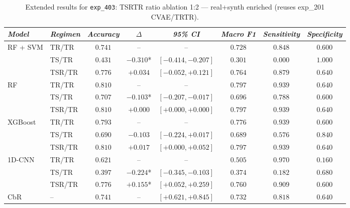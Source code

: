 \begin{table}[H]
\centering
\scriptsize
\caption{Extended results for \texttt{exp\_403}: TSRTR ratio ablation 1:2 — real+synth enriched (reuses exp\_201 CVAE/TRTR).}
\label{tab:appendix_exp_403}
\begin{tabular*}{\textwidth}{@{\extracolsep{\fill}}llcccccc}
\toprule
\emph{Model} & \emph{Regimen} & \emph{Accuracy} & \emph{$\Delta$} & \emph{95\% CI} & \emph{Macro F1} & \emph{Sensitivity} & \emph{Specificity}\\
\midrule
\multirow{3}{*}{RF + SVM} & TR/TR & $0.741$ & -- & -- & $0.728$ & $0.848$ & $0.600$\\
 & TS/TR & $0.431$ & $-0.310$* & $[-0.414, -0.207]$ & $0.301$ & $0.000$ & $1.000$\\
 & TSR/TR & $0.776$ & $+0.034$ & $[-0.052, +0.121]$ & $0.764$ & $0.879$ & $0.640$\\
\midrule
\multirow{3}{*}{RF} & TR/TR & $0.810$ & -- & -- & $0.797$ & $0.939$ & $0.640$\\
 & TS/TR & $0.707$ & $-0.103$* & $[-0.207, -0.017]$ & $0.696$ & $0.788$ & $0.600$\\
 & TSR/TR & $0.810$ & $+0.000$ & $[+0.000, +0.000]$ & $0.797$ & $0.939$ & $0.640$\\
\midrule
\multirow{3}{*}{XGBoost} & TR/TR & $0.793$ & -- & -- & $0.776$ & $0.939$ & $0.600$\\
 & TS/TR & $0.690$ & $-0.103$ & $[-0.224, +0.017]$ & $0.689$ & $0.576$ & $0.840$\\
 & TSR/TR & $0.810$ & $+0.017$ & $[+0.000, +0.052]$ & $0.797$ & $0.939$ & $0.640$\\
\midrule
\multirow{3}{*}{1D-CNN} & TR/TR & $0.621$ & -- & -- & $0.505$ & $0.970$ & $0.160$\\
 & TS/TR & $0.397$ & $-0.224$* & $[-0.345, -0.103]$ & $0.374$ & $0.182$ & $0.680$\\
 & TSR/TR & $0.776$ & $+0.155$* & $[+0.052, +0.259]$ & $0.760$ & $0.909$ & $0.600$\\
\midrule
CbR & -- & $0.741$ & -- & $[+0.621, +0.845]$ & $0.732$ & $0.818$ & $0.640$\\
\bottomrule
\end{tabular*}
\end{table}

